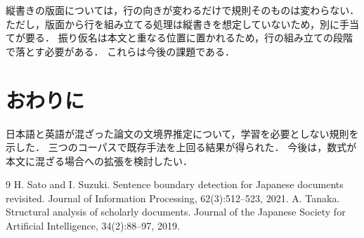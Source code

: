 \documentclass[11pt,a4paper]{article}
\newcommand{\s}[1]{#1}
\begin{document}
\s{縦書きの版面については，行の向きが変わるだけで規則そのものは変わらない．}%
\s{ただし，版面から行を組み立てる処理は縦書きを想定していないため，別に手当てが要る．}%
\s{振り仮名は本文と重なる位置に置かれるため，行の組み立ての段階で落とす必要がある．}%
\s{これらは今後の課題である．}%

\section{おわりに}

\s{日本語と英語が混ざった論文の文境界推定について，学習を必要としない規則を示した．}%
\s{三つのコーパスで既存手法を上回る結果が得られた．}%
\s{今後は，数式が本文に混ざる場合への拡張を検討したい．}%

\begin{thebibliography}{9}
H. Sato and I. Suzuki. Sentence boundary detection for Japanese documents revisited. Journal of Information Processing, 62(3):512--523, 2021.
A. Tanaka. Structural analysis of scholarly documents. Journal of the Japanese Society for Artificial Intelligence, 34(2):88--97, 2019.
\end{thebibliography}
\end{document}
